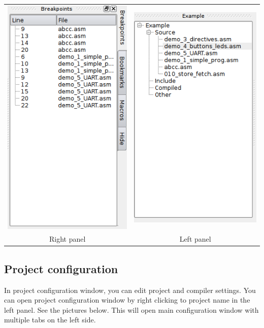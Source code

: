     \begin{table}[h!]
        \begin{tabular}{cc}
            \includegraphics[width=.33\textwidth]{img/right_panel.png}
                &
            \includegraphics[width=.33\textwidth]{img/left_panel.png}
                \\ 
            Right panel & Left panel
        \end{tabular}
    \end{table}

    
\clearpage
\enlargethispage{6\baselineskip}
\subsection{Project configuration}
    In project configuration window, you can edit project and compiler settings. You can open project configuration window by right clicking to project name in the left panel. See the pictures below.
    This will open main configuration window with multiple tabs on the left side.

